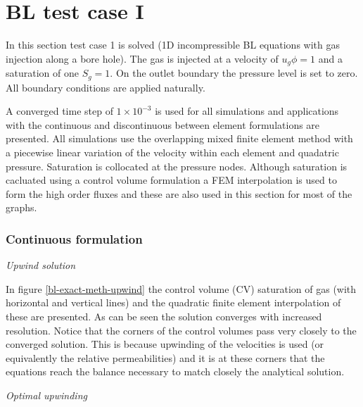 



\section{BL test case I}

In this section test case 1 is solved (1D incompressible 
BL equations with gas injection along a bore hole). 
The gas is injected at a velocity of $u_g \phi =1$ and 
a saturation of one $S_g=1$. On the outlet boundary the 
pressure level is set to zero. All boundary conditions are 
applied naturally. 

A converged time step of $1\times 10^{-3}$ is used for all simulations 
and applications with the continuous and discontinuous between 
element formulations are presented. All simulations 
use the overlapping mixed finite element method with a 
piecewise linear variation of the velocity within each 
element and quadatric pressure. Saturation is collocated at 
the pressure nodes. Although saturation is cacluated using 
a control volume formulation a FEM interpolation is 
used to form the high order fluxes and these are also 
used in this section for most of the graphs. 


\subsubsection{Continuous formulation}

{\it Upwind solution} 

In figure \ref{bl-exact-meth-upwind}  the 
control volume (CV) saturation of gas (with horizontal and vertical lines) and 
the quadratic finite element interpolation of these are 
presented. 
As can be seen the solution converges with increased resolution. 
Notice that the corners of the control volumes pass 
very closely 
to the converged solution. This is because upwinding of 
the velocities is used (or equivalently the relative permeabilities) 
and it is at these corners that the equations reach the 
balance necessary to match closely the analytical solution. 

{\it Optimal upwinding} 

